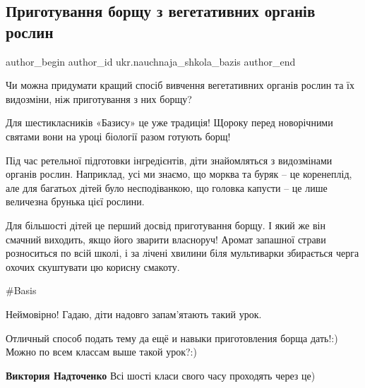  
 
 
 
 
 
\subsection{Приготування борщу з вегетативних органів рослин}
\label{sec:15_12_2021.fb.ukr.nauchnaja_shkola_bazis.1.borsch_roslyny}
 
\ifcmt
 author_begin
   author_id ukr.nauchnaja_shkola_bazis
 author_end
\fi

Чи можна придумати кращий спосіб вивчення вегетативних органів рослин та їх
видозміни, ніж приготування з них борщу?


Для шестикласників «Базису» це уже традиція! Щороку перед новорічними святами
вони на уроці біології разом готують борщ!  


Під час ретельної підготовки інгредієнтів, діти знайомляться з видозмінами
органів рослин. Наприклад, усі ми знаємо, що морква та буряк – це коренеплід,
але для багатьох дітей було несподіванкою, що головка капусти – це лише
величезна брунька цієї рослини. 


Для більшості дітей це перший досвід приготування борщу. І який же він смачний
виходить, якщо його зварити власноруч! Аромат запашної страви розноситься по
всій школі, і за лічені хвилини біля мультиварки збирається черга охочих
скуштувати цю корисну смакоту.

\#Basis

\begin{itemize} %
Неймовірно! Гадаю, діти надовго запам'ятають такий урок.


Отличный способ подать тему да ещё и навыки приготовления борща дать!:) Можно
по всем классам выше такой урок?:)


\textbf{Виктория Надточенко} Всі шості класи свого часу проходять через це)
\end{itemize} %
